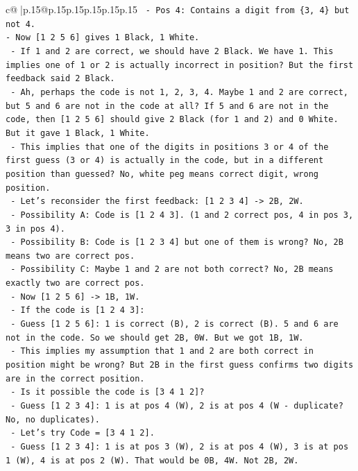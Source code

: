 \documentclass{article}
\begin{document}
{\begin{supertabular}{c@{$\;$}|p{.15\linewidth}@{}p{.15\linewidth}p{.15\linewidth}p{.15\linewidth}p{.15\linewidth}p{.15\linewidth}}
{{{\texttt{  {-} Pos 4: Contains a digit from \{3, 4\} but not 4.} \\
\texttt{{-} Now {[}1 2 5 6{]} gives 1 Black, 1 White.} \\
\texttt{  {-} If 1 and 2 are correct, we should have 2 Black. We have 1. This implies one of 1 or 2 is actually incorrect in position? But the first feedback said 2 Black.} \\
\texttt{  {-} Ah, perhaps the code is not 1, 2, 3, 4. Maybe 1 and 2 are correct, but 5 and 6 are not in the code at all? If 5 and 6 are not in the code, then {[}1 2 5 6{]} should give 2 Black (for 1 and 2) and 0 White. But it gave 1 Black, 1 White.} \\
\texttt{  {-} This implies that one of the digits in positions 3 or 4 of the first guess (3 or 4) is actually in the code, but in a different position than guessed? No, white peg means correct digit, wrong position.} \\
\texttt{  {-} Let's reconsider the first feedback: {[}1 2 3 4{]} {-}> 2B, 2W.} \\
\texttt{    {-} Possibility A: Code is {[}1 2 4 3{]}. (1 and 2 correct pos, 4 in pos 3, 3 in pos 4).} \\
\texttt{    {-} Possibility B: Code is {[}1 2 3 4{]} but one of them is wrong? No, 2B means two are correct pos.} \\
\texttt{    {-} Possibility C: Maybe 1 and 2 are not both correct? No, 2B means exactly two are correct pos.} \\
\texttt{  {-} Now {[}1 2 5 6{]} {-}> 1B, 1W.} \\
\texttt{    {-} If the code is {[}1 2 4 3{]}:} \\
\texttt{      {-} Guess {[}1 2 5 6{]}: 1 is correct (B), 2 is correct (B). 5 and 6 are not in the code. So we should get 2B, 0W. But we got 1B, 1W.} \\
\texttt{    {-} This implies my assumption that 1 and 2 are both correct in position might be wrong? But 2B in the first guess confirms two digits are in the correct position.} \\
\texttt{    {-} Is it possible the code is {[}3 4 1 2{]}?} \\
\texttt{      {-} Guess {[}1 2 3 4{]}: 1 is at pos 4 (W), 2 is at pos 4 (W {-} duplicate? No, no duplicates).} \\
\texttt{      {-} Let's try Code = {[}3 4 1 2{]}.} \\
\texttt{        {-} Guess {[}1 2 3 4{]}: 1 is at pos 3 (W), 2 is at pos 4 (W), 3 is at pos 1 (W), 4 is at pos 2 (W). That would be 0B, 4W. Not 2B, 2W.} \\
}}}
\end{supertabular}}
\end{document}
